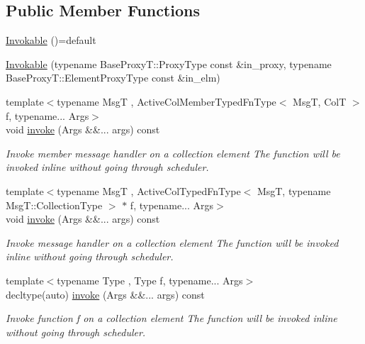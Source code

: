 \subsection*{Public Member Functions}
\begin{DoxyCompactItemize}
\item 
\hyperlink{structvt_1_1vrt_1_1collection_1_1_invokable_a6e64beec04b07f74b75ff37d088df3fe}{Invokable} ()=default
\item 
\hyperlink{structvt_1_1vrt_1_1collection_1_1_invokable_ac560937c6424cfb4471ba165914f0702}{Invokable} (typename Base\+Proxy\+T\+::\+Proxy\+Type const \&in\+\_\+proxy, typename Base\+Proxy\+T\+::\+Element\+Proxy\+Type const \&in\+\_\+elm)
\item 
{\footnotesize template$<$typename MsgT , Active\+Col\+Member\+Typed\+Fn\+Type$<$ Msg\+T, Col\+T $>$ f, typename... Args$>$ }\\void \hyperlink{structvt_1_1vrt_1_1collection_1_1_invokable_ab7ad9b74cbf75b0f1df13e0cc88311b7}{invoke} (Args \&\&... args) const
\begin{DoxyCompactList}\small\item\em Invoke member message handler on a collection element The function will be invoked inline without going through scheduler. \end{DoxyCompactList}\item 
{\footnotesize template$<$typename MsgT , Active\+Col\+Typed\+Fn\+Type$<$ Msg\+T, typename Msg\+T\+::\+Collection\+Type $>$ $\ast$ f, typename... Args$>$ }\\void \hyperlink{structvt_1_1vrt_1_1collection_1_1_invokable_ab7ad9b74cbf75b0f1df13e0cc88311b7}{invoke} (Args \&\&... args) const
\begin{DoxyCompactList}\small\item\em Invoke message handler on a collection element The function will be invoked inline without going through scheduler. \end{DoxyCompactList}\item 
{\footnotesize template$<$typename Type , Type f, typename... Args$>$ }\\decltype(auto) \hyperlink{structvt_1_1vrt_1_1collection_1_1_invokable_a7e79eec4ab212b7e940c0ffaa8a2c171}{invoke} (Args \&\&... args) const
\begin{DoxyCompactList}\small\item\em Invoke function \textquotesingle{}f\textquotesingle{} on a collection element The function will be invoked inline without going through scheduler. \end{DoxyCompactList}\end{DoxyCompactItemize}


